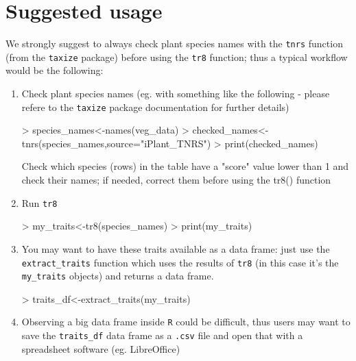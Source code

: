 \documentclass{article}
\begin{document}
  
  
 \section{Suggested usage}

  We strongly suggest to always check plant species names with the
  \texttt{tnrs} function (from the \texttt{taxize} package) before
  using the \texttt{tr8} function; thus a typical workflow would be
  the following:
  
  \begin{enumerate}
  \item Check plant species names (eg. with something like the following -  please refere to the \texttt{taxize} package documentation\cite{taxize} for further details)
    
\begin{Schunk}
\begin{Sinput}
> species_names<-names(veg_data)
> checked_names<-tnrs(species_names,source="iPlant_TNRS")
> print(checked_names)
\end{Sinput}
\end{Schunk}

 Check which species (rows) in the table have a "score" value
 lower than 1 and check their names; if needed, correct them
 before using the tr8() function
\item Run \texttt{tr8}

\begin{Schunk}
\begin{Sinput}
> my_traits<-tr8(species_names)
> print(my_traits)
\end{Sinput}
\end{Schunk}
 
\item You may want to have these traits available as a data frame:
  just use the \texttt{extract\_traits} function which uses the results
  of \texttt{tr8} (in this case it's the \texttt{my\_traits} objects)
  and returns a data frame.

\begin{Schunk}
\begin{Sinput}
> traits_df<-extract_traits(my_traits)
\end{Sinput}
\end{Schunk}

\item Observing a big data frame inside \texttt{R} could be difficult,
  thus users may want to save the \texttt{traits\_df} data frame as a
  \texttt{.csv} file and open that with a spreadsheet software (eg. LibreOffice)
 
  \end{enumerate}
  
\end{document}
